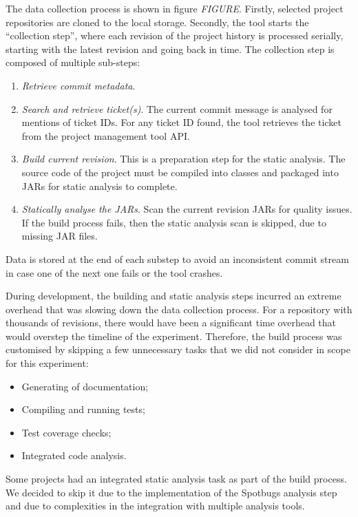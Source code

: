 \documentclass{mpaper}
\begin{document}
The data collection process is shown in figure \emph{FIGURE}. Firstly, selected
project repositories are cloned to the local storage. Secondly, the tool starts
the ``collection step'', where each revision of the project history is processed
serially, starting with the latest revision and going back in time. The
collection step is composed of multiple sub-steps:
\begin{enumerate}
  \item \emph{Retrieve commit metadata}.
  \item \emph{Search and retrieve ticket(s)}. The current commit message is
  analysed for mentions of ticket IDs. For any ticket ID found, the tool
  retrieves the ticket from the project management tool API.
  \item \emph{Build current revision}. This is a preparation step for the static
  analysis. The source code of the project must be compiled into classes and
  packaged into JARs for static analysis to complete.
  \item \emph{Statically analyse the JARs}. Scan the current revision JARs for
  quality issues. If the build process fails, then the static analysis scan is
  skipped, due to missing JAR files. 
\end{enumerate}

Data is stored at the end of each substep to avoid an inconsistent commit stream
in case one of the next one fails or the tool crashes.

During development, the building and static analysis steps incurred an extreme
overhead that was slowing down the data collection process. For a repository
with thousands of revisions, there would have been a significant time overhead
that would overstep the timeline of the experiment. Therefore, the build process
was customised by skipping a few unnecessary tasks that we did not consider in
scope for this experiment:

\begin{itemize}
  \item Generating of documentation;
  \item Compiling and running tests;
  \item Test coverage checks;
  \item Integrated code analysis.
\end{itemize}

Some projects had an integrated static analysis task as part of the build
process. We decided to skip it due to the implementation of the Spotbugs
analysis step and due to complexities in the integration with multiple analysis
tools. 
\end{document}
